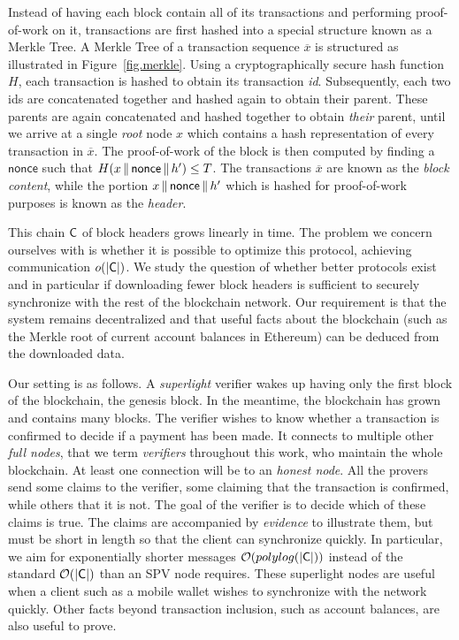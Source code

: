 Instead of having each block contain all of its
transactions and performing proof-of-work on it, transactions are first hashed
into a special structure known as a Merkle Tree. A Merkle Tree of a transaction
sequence $\overline{x}$ is structured as illustrated in Figure~\ref{fig.merkle}. Using a cryptographically
secure hash function $H$, each transaction is hashed to obtain its transaction
\emph{id}. Subsequently, each two ids are concatenated together and hashed again
to obtain their parent. These parents are again concatenated and hashed
together to obtain \emph{their} parent, until we arrive at a single \emph{root}
node $x$ which contains a hash representation of every transaction in
$\overline{x}$. The proof-of-work of the block is then computed by finding a
$\textsf{nonce}$ such that $H(x \,\|\, \textsf{nonce} \,\|\, h') \leq T$. The
transactions $\overline{x}$ are known as the \emph{block content}, while the
portion $x \,\|\, \textsf{nonce} \,\|\, h'$ which is hashed for proof-of-work
purposes is known as the \emph{header}.

This chain $\mathsf{C}$ of block headers grows linearly in time. The problem we
concern ourselves with is whether it is possible to optimize this protocol,
achieving communication $o(|\mathsf{C}|)$. We study the question of whether better
protocols exist and in particular if downloading fewer block headers is
sufficient to securely synchronize with the rest of the blockchain network. Our
requirement is that the system remains decentralized and that useful facts about
the blockchain (such as the Merkle root of current account balances in Ethereum)
can be deduced from the downloaded data.

Our setting is as follows. A \emph{superlight} verifier wakes up having only the
first block of the blockchain, the genesis block. In the meantime, the
blockchain has grown and contains many blocks. The verifier wishes to know
whether a transaction is confirmed to decide if a payment has been made. It
connects to multiple other \emph{full nodes}, that we term \emph{verifiers}
throughout this work, who maintain the whole blockchain. At least one connection
will be to an \emph{honest node}. All the provers send some claims to the
verifier, some claiming that the transaction is confirmed, while others that it
is not. The goal of the verifier is to decide which of these claims is true. The
claims are accompanied by \emph{evidence} to illustrate them, but must be short
in length so that the client can synchronize quickly. In particular, we aim for
exponentially shorter messages $\mathcal{O}(polylog(|\mathsf{C}|))$ instead of the
standard $\mathcal{O}(|\mathsf{C}|)$ than an SPV node requires. These superlight nodes are
useful when a client such as a mobile wallet wishes to synchronize with the
network quickly. Other facts beyond transaction inclusion, such as account
balances, are also useful to prove.

